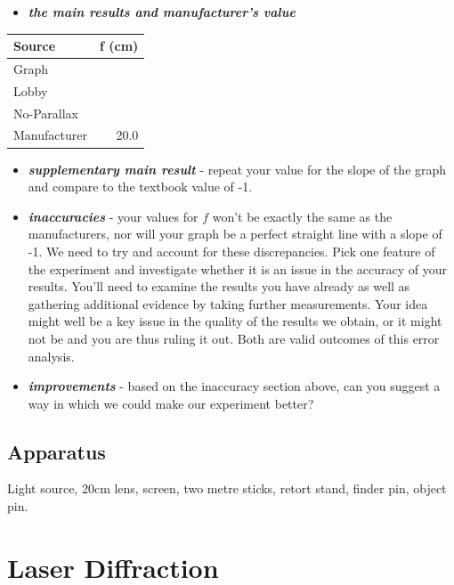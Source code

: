 \documentclass[
  letterpaper,
  DIV=11,
  numbers=noendperiod]{scrreprt}
\providecommand{\tightlist}{%
  \setlength{\itemsep}{0pt}\setlength{\parskip}{0pt}}\usepackage{longtable,booktabs,array}
\begin{document}
\begin{itemize}
\tightlist
\item
  \textbf{\emph{the main results and manufacturer's value}}
\end{itemize}

\begin{table}
\fontsize{12.0pt}{14.0pt}\selectfont
\begin{tabular*}{\linewidth}{@{\extracolsep{\fill}}lr}
\toprule
Source & f (cm) \\ 
\midrule\addlinespace[2.5pt]
Graph &  \\ 
Lobby &  \\ 
No-Parallax &  \\ 
Manufacturer & 20.0 \\ 
\bottomrule
\end{tabular*}
\end{table}

\begin{itemize}
\item
  \textbf{\emph{supplementary main result}} - repeat your value for the
  slope of the graph and compare to the textbook value of -1.
\item
  \textbf{\emph{inaccuracies}} - your values for \(f\) won't be exactly
  the same as the manufacturers, nor will your graph be a perfect
  straight line with a slope of -1. We need to try and account for these
  discrepancies. Pick one feature of the experiment and investigate
  whether it is an issue in the accuracy of your results. You'll need to
  examine the results you have already as well as gathering additional
  evidence by taking further measurements. Your idea might well be a key
  issue in the quality of the results we obtain, or it might not be and
  you are thus ruling it out. Both are valid outcomes of this error
  analysis.
\item
  \textbf{\emph{improvements}} - based on the inaccuracy section above,
  can you suggest a way in which we could make our experiment better?
\end{itemize}

\section{Apparatus}\label{apparatus-8}

Light source, 20cm lens, screen, two metre sticks, retort stand, finder
pin, object pin.


\chapter{Laser Diffraction}\label{laser-diffraction}
\end{document}
